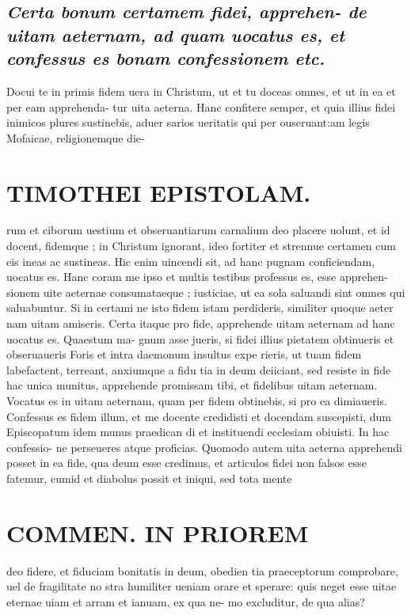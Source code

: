 \documentclass{article}
\begin{document}
\begin{pages}
\subsection*{\textit{Certa bonum certamem fidei, apprehen- de uitam aeternam, ad quam uocatus es, et confessus es bonam confessionem etc. }}\pstart Docui te in primis fidem uera in Christum, ut et tu doceas omnes, et ut in ea et per eam apprehenda- tur uita aeterna. Hanc confitere semper, et quia illius fidei inimicos plures sustinebis, aduer sarios ueritatis qui per ouseruant:am legis Mofaicae, religionemque die-  \pend
\section*{TIMOTHEI EPISTOLAM. }
\marginpar{[ p.171 ]}\pstart rum et ciborum uestium et obseruantiarum carnalium deo placere uolunt, et id docent, fidemque ; in Christum ignorant, ideo fortiter et strennue certamen cum eis ineas ac sustineas. Hic enim uincendi sit, ad hanc pugnam conficiendam, uocatus es. Hanc coram me ipso et multis testibus professus es, esse apprehen- sionem uite aeternae consumataeque ; iusticiae, ut ea sola saluandi sint omnes qui saluabuntur. Si in certami ne isto fidem istam perdideris, similiter quoque aeter nam uitam amiseris. Certa itaque pro fide, apprehende uitam aeternam ad hanc uocatus es. Quaestum ma- gnum asse jueris, si fidei illius pietatem obtinueris et obseruaueris Foris et intra daemonum insultus expe rieris, ut tuam fidem labefactent, terreant, anxiumque a fidu tia in deum deiiciant, sed resiste in fide hac unica munitus, apprehende promissam tibi, et fidelibus uitam aeternam. Vocatus es in uitam aeternam, quam per fidem obtinebis, si pro ea dimiaueris. Confessus es fidem illum, et me docente credidisti et docendam suscepisti, dum Episcopatum idem munus praedican di et instituendi ecclesiam obiuisti. In hac confessio- ne perseueres atque proficias. Quomodo autem uita aeterna apprehendi posset in ea fide, qua deum esse credimus, et articulos fidei non falsos esse fatemur, cumid et diabolus possit et iniqui, sed tota mente  \pend
\section*{COMMEN. IN PRIOREM }
\marginpar{[ p.172 ]}\pstart deo fidere, et fiduciam bonitatis in deum, obedien tia praeceptorum comprobare, uel de fragilitate no stra humiliter ueniam orare et sperare: quis neget esse uitae eternae uiam et arram et ianuam, ex qua ne- mo excluditur, de qua alias?  \pend
{}
{}

\end{pages}
\end{document}
